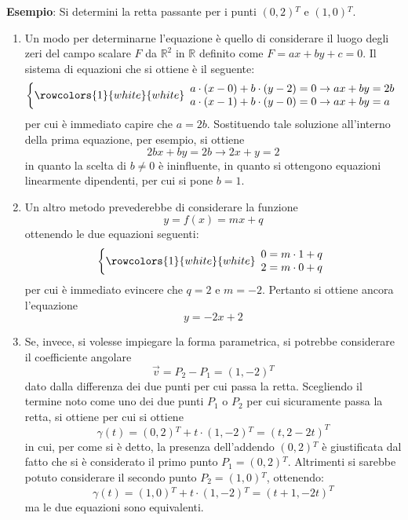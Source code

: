 \documentclass[a4paper]{extarticle}
\begin{document}
\vspace{1em}
\noindent
\textbf{Esempio}: Si determini la retta passante per i punti $(0,2){^T}$ e $(1,0){^T}$.
\begin{enumerate}
    \item Un modo per determinarne l'equazione è quello di considerare il luogo degli zeri del campo scalare $F$ da $\mathbb{R}^2$ in $\mathbb{R}$ definito come $F=ax+by+c=0$. Il sistema di equazioni che si ottiene è il seguente:
    \[\left\{
        \rowcolors{1}{white}{white}
        \begin{array}{l}
            a \cdot (x-0) + b \cdot (y-2) = 0 \rightarrow ax + by = 2b\\
            a \cdot (x-1) + b \cdot (y-0) = 0 \rightarrow ax + by = a\\
        \end{array}
    \right.\]
    per cui è immediato capire che $a=2b$. Sostituendo tale soluzione all'interno della prima equazione, per esempio, si ottiene
    \[2bx + by = 2b \rightarrow 2x + y = 2\]
    in quanto la scelta di $b \neq 0$ è ininfluente, in quanto si ottengono equazioni linearmente dipendenti, per cui si pone $b=1$.

    \item Un altro metodo prevederebbe di considerare la funzione
    \[y=f(x)=mx+q\]
    ottenendo le due equazioni seguenti:
    \[\left\{
        \rowcolors{1}{white}{white}
        \begin{array}{l}
            0=m \cdot 1 + q\\
            2=m \cdot 0 + q
        \end{array}
    \right.\]
    per cui è immediato evincere che $q=2$ e $m=-2$. Pertanto si ottiene ancora l'equazione
    \[y=-2x+2\]

    \item Se, invece, si volesse impiegare la forma parametrica, si potrebbe considerare il coefficiente angolare
    \[\vec v = P_2-P_1=(1,-2){^T}\]
    dato dalla differenza dei due punti per cui passa la retta. Scegliendo il termine noto come uno dei due punti $P_1$ o $P_2$ per cui sicuramente passa la retta, si ottiene
    per cui si ottiene 
    \[\gamma(t) = (0,2){^T} + t \cdot (1,-2){^T} = (t,2-2t)^{T}\]
    in cui, per come si è detto, la presenza dell'addendo $(0,2){^T}$ è giustificata dal fatto che si è considerato il primo punto $P_1=(0,2){^T}$. Altrimenti si sarebbe potuto considerare il secondo punto $P_2=(1,0){^T}$, ottenendo:
    \[\gamma(t) = (1,0){^T} + t \cdot (1,-2){^T} = (t+1,-2t)^{T}\]
    ma le due equazioni sono equivalenti.
\end{enumerate}
\end{document}
